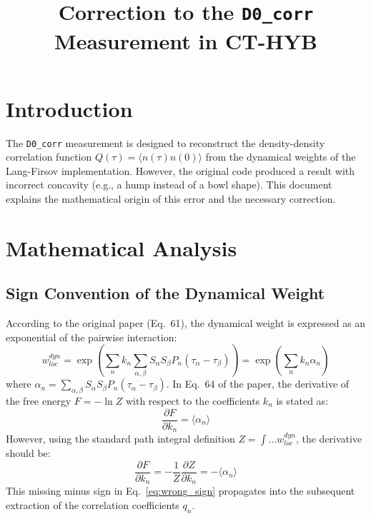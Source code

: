 \documentclass{article}
\title{Correction to the \texttt{D0\_corr} Measurement in CT-HYB}
\author{}
\date{}
\begin{document}
\maketitle

\section{Introduction}
The \texttt{D0\_corr} measurement is designed to reconstruct the density-density correlation function $Q(\tau) = \langle n(\tau)n(0) \rangle$ from the dynamical weights of the Lang-Firsov implementation. However, the original code produced a result with incorrect concavity (e.g., a hump instead of a bowl shape). This document explains the mathematical origin of this error and the necessary correction.

\section{Mathematical Analysis}

\subsection{Sign Convention of the Dynamical Weight}
According to the original paper (Eq.~61), the dynamical weight is expressed as an exponential of the pairwise interaction:
\begin{equation}
w^{dyn}_{loc} = \exp\left( \sum_n k_n \sum_{\alpha,\beta} S_\alpha S_\beta P_n(\tau_\alpha - \tau_\beta) \right) = \exp\left( \sum_n k_n \alpha_n \right)
\end{equation}
where $\alpha_n = \sum_{\alpha,\beta} S_\alpha S_\beta P_n(\tau_\alpha - \tau_\beta)$.
In Eq.~64 of the paper, the derivative of the free energy $F = -\ln Z$ with respect to the coefficients $k_n$ is stated as:
\begin{equation}
\frac{\partial F}{\partial k_n} = \langle \alpha_n \rangle \label{eq:wrong_sign}
\end{equation}
However, using the standard path integral definition $Z = \int \dots w^{dyn}_{loc}$, the derivative should be:
\begin{equation}
\frac{\partial F}{\partial k_n} = -\frac{1}{Z} \frac{\partial Z}{\partial k_n} = - \langle \alpha_n \rangle
\end{equation}
This missing minus sign in Eq.~\eqref{eq:wrong_sign} propagates into the subsequent extraction of the correlation coefficients $q_n$. 
\end{document}
